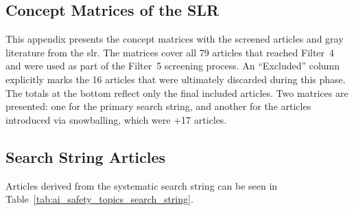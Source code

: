 \begin{landscape}
	\chapter{Concept Matrices of the SLR}\label{appendixa}
	
	This appendix presents the concept matrices with the screened articles and gray literature from the \gls{slr}. The matrices cover all 79 articles that reached Filter~4 and were used as part of the Filter~5 screening process. An ``Excluded'' column explicitly marks the 16 articles that were ultimately discarded during this phase. The totals at the bottom reflect only the final included articles. Two matrices are presented: one for the primary search string, and another for the articles introduced via snowballing, which were +17 articles.

	\section{Search String Articles}\label{sec:search_string__articles_slr}

	Articles derived from the systematic search string can be seen in Table~\ref{tab:ai_safety_topics_search_string}.

\clearpage


\end{landscape}
